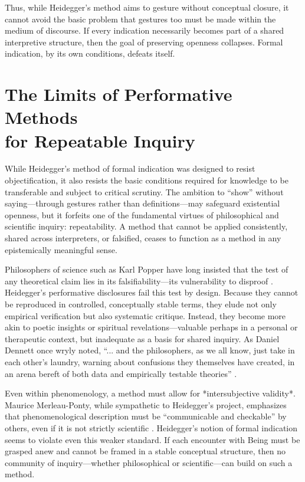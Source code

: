 \documentclass{article}
\begin{document}
Thus, while Heidegger’s method aims to gesture without conceptual closure, it cannot avoid the basic problem that gestures too must be made within the medium of discourse. If every indication necessarily becomes part of a shared interpretive structure, then the goal of preserving openness collapses. Formal indication, by its own conditions, defeats itself.

\section*{The Limits of Performative Methods \\ for Repeatable Inquiry}

While Heidegger's method of formal indication was designed to resist objectification, it also resists the basic conditions required for knowledge to be transferable and subject to critical scrutiny. The ambition to “show” without saying—through gestures rather than definitions—may safeguard existential openness, but it forfeits one of the fundamental virtues of philosophical and scientific inquiry: repeatability. A method that cannot be applied consistently, shared across interpreters, or falsified, ceases to function as a method in any epistemically meaningful sense.

Philosophers of science such as Karl Popper have long insisted that the test of any theoretical claim lies in its falsifiability—its vulnerability to disproof \parencite[pp.~39–42]{popper2002}. Heidegger's performative disclosures fail this test by design. Because they cannot be reproduced in controlled, conceptually stable terms, they elude not only empirical verification but also systematic critique. Instead, they become more akin to poetic insights or spiritual revelations—valuable perhaps in a personal or therapeutic context, but inadequate as a basis for shared inquiry. As Daniel Dennett once wryly noted, “... and the philosophers, as we all know, just take in each other’s laundry, warning about confusions they themselves have created, in an arena bereft of both data and empirically testable theories” \parencite[p.~255]{dennett1991}.

Even within phenomenology, a method must allow for *intersubjective validity*. Maurice Merleau-Ponty, while sympathetic to Heidegger’s project, emphasizes that phenomenological description must be “communicable and checkable” by others, even if it is not strictly scientific \parencite[p.~xv]{merleauponty1962}. Heidegger’s notion of formal indication seems to violate even this weaker standard. If each encounter with Being must be grasped anew and cannot be framed in a stable conceptual structure, then no community of inquiry—whether philosophical or scientific—can build on such a method.
\end{document}
